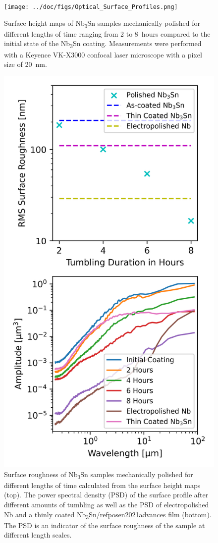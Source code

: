 \documentclass[reprint,amsmath,amssymb,aps]{revtex4-2}%
\begin{document}
\begin{figure}[t]%
\centering%
\texttt{[image: ../doc/figs/Optical\_Surface\_Profiles.png]}%
\caption{Surface height maps of Nb\textsubscript{3}Sn samples mechanically polished for different lengths of time ranging from 2 to 8~hours compared to the initial state of the Nb\textsubscript{3}Sn coating. Measurements were performed with a Keyence VK-X3000 confocal laser microscope with a pixel size of 20~nm.}%
\label{fig:opticalsurfaceprofiles}%
\end{figure}

%


\begin{figure}[t]%
\centering%
\includegraphics[width=0.8\columnwidth]{../doc/figs/Surface_Roughness_Graph.png}%
\caption{Surface roughness of Nb\textsubscript{3}Sn samples mechanically polished for different lengths of time calculated from the surface height maps (top). The power spectral density (PSD) of the surface profile after different amounts of tumbling as well as the PSD of electropolished Nb and a thinly coated Nb\textsubscript{3}Sn/ref{posen2021advances} film (bottom). The PSD is an indicator of the surface roughness of the sample at different length scales.}%
\label{fig:surfaceroughnessgraph}%
\end{figure}
\end{document}
